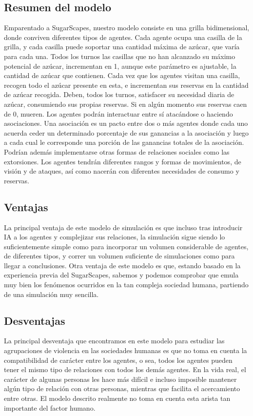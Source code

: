 \documentclass[11pt]{article}
\begin{document}
\subsection{Resumen del modelo}
Emparentado a SugarScapes, nuestro modelo consiste en una grilla bidimensional, donde conviven diferentes tipos de agentes. Cada agente ocupa una casilla de la grilla, y cada casilla puede soportar una cantidad máxima de azúcar, que varía para cada una. Todos los turnos las casillas que no han alcanzado su máximo potencial de azúcar, incrementan en 1, aunque este parámetro es ajustable, la cantidad de azúcar que contienen. Cada vez que los agentes visitan una casilla, recogen todo el azúcar presente en esta, e incrementan sus reservas en la cantidad de azúcar recogida. Deben, todos los turnos, satisfacer su necesidad diaria de azúcar, consumiendo sus propias reservas. Si en algún momento sus reservas caen de 0, mueren.
Los agentes podrán interactuar entre sí atacándose o haciendo asociaciones. Una asociación es un pacto entre dos o más agentes donde cada uno acuerda ceder un determinado porcentaje de sus ganancias a la asociación y luego a cada cual le corresponde una porción de las ganancias totales de la asociación. Podrían además implementarse otras formas de relaciones sociales como las extorsiones.
Los agentes tendrán diferentes rangos y formas de movimientos, de visión y de ataques, así como nacerán con diferentes necesidades de consumo y reservas.
\subsection{Ventajas}
La principal ventaja de este modelo de simulación es que incluso tras introducir IA a los agentes y complejizar sus relaciones, la simulación sigue siendo lo suficientemente simple como para incorporar un volumen considerable de agentes, de diferentes tipos, y correr un volumen suficiente de simulaciones como para llegar a conclusiones. Otra ventaja de este modelo es que, estando basado en la experiencia previa del SugarScapes, sabemos y podemos comprobar que emula muy bien los fenómenos ocurridos en la tan compleja sociedad humana, partiendo de una simulación muy sencilla.
\subsection{Desventajas}
La principal desventaja que encontramos en este modelo para estudiar las agrupaciones de violencia en las sociedades humanas es que no toma en cuenta la compatibilidad de carácter entre los agentes, o sea, todos los agentes pueden tener el mismo tipo de relaciones con todos los demás agentes. En la vida real, el carácter de algunas personas les hace más difícil e incluso imposible mantener algún tipo de relación con otras personas, mientras que facilita el acercamiento entre otras. El modelo descrito realmente no toma en cuenta esta arista tan importante del factor humano.
\end{document}
